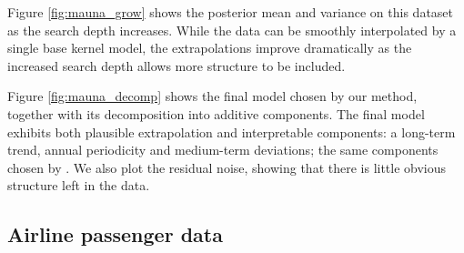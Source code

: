 Figure \ref{fig:mauna_grow} shows the posterior mean and variance on this dataset as the search depth increases.
While the data can be smoothly interpolated by a single base kernel model, the extrapolations improve dramatically as the increased search depth allows more structure to be included.

Figure \ref{fig:mauna_decomp} shows the final model chosen by our method, together with its decomposition into additive components.
The final model exhibits both plausible extrapolation and interpretable components: a long-term trend, annual periodicity and medium-term deviations; the same components chosen by \citet{rasmussen38gaussian}.
We also plot the residual noise, showing that there is little obvious structure left in the data.  






\subsection{Airline passenger data}

